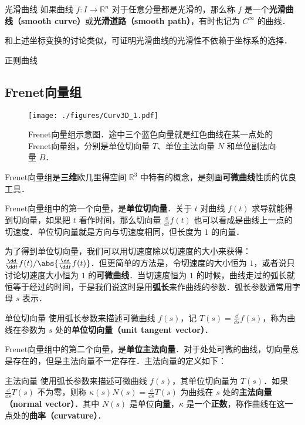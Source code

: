 \begin{definition}{光滑曲线}
如果曲线 $f:I\to\mathbb{R}^n$ 对于任意分量都是光滑的，那么称 $f$ 是一个\textbf{光滑曲线（smooth curve）}或\textbf{光滑道路（smooth path）}，有时也记为 $C^\infty$ 的曲线．
\end{definition}

和上述坐标变换的讨论类似，可证明光滑曲线的光滑性不依赖于坐标系的选择．

\begin{definition}{正则曲线}

\end{definition}

\subsection{Frenet向量组}

\begin{figure}[ht]
\centering
\texttt{[image: ./figures/Curv3D\_1.pdf]}
\caption{Frenet向量组示意图．途中三个蓝色向量就是红色曲线在某一点处的Frenet向量组，分别是单位切向量 $T$、单位主法向量 $N$ 和单位副法向量 $B$．} \label{Curv3D_fig1}
\end{figure}

Frenet向量组是\textbf{三维}欧几里得空间 $\mathbb{R}^3$ 中特有的概念，是刻画\textbf{可微曲线}性质的优良工具．

Frenet向量组中的第一个向量，是\textbf{单位切向量}．关于 $t$ 对曲线 $f(t)$ 求导就能得到切向量，如果把 $t$ 看作时间，那么切向量 $\frac{\dd}{\dd t}f(t)$ 也可以看成是曲线上一点的切速度．单位切向量就是方向与切速度相同，但长度为 $1$ 的向量．

为了得到单位切向量，我们可以用切速度除以切速度的大小来获得：$\frac{\dd}{\dd t}f(t)/\abs{\frac{\dd}{\dd t}f(t)}$．但更简单的方法是，令切速度的大小恒为 $1$，或者说只讨论切速度大小恒为 $1$ 的\textbf{可微曲线}．当切速度恒为 $1$ 的时候，曲线走过的弧长就恒等于经过的时间，于是我们说这时是用\textbf{弧长}来作曲线的参数．弧长参数通常用字母 $s$ 表示．

\begin{definition}{单位切向量}\label{Curv3D_def1}
使用弧长参数来描述可微曲线 $f(s)$，记 $T(s)=\frac{\dd}{\dd s}f(s)$，称为曲线在参数为 $s$ 处的\textbf{单位切向量（unit tangent vector）}．
\end{definition}

Frenet向量组中的第二个向量，是\textbf{单位主法向量}．对于处处可微的曲线，切向量总是存在的，但是主法向量不一定存在．主法向量的定义如下：

\begin{definition}{主法向量}\label{Curv3D_def2}
使用弧长参数来描述可微曲线 $f(s)$，其单位切向量为 $T(s)$．如果 $\frac{\dd}{\dd s}T(s)$ 不为零，则称 $\kappa(s) N(s)=\frac{\dd}{\dd s}T(s)$ 为曲线在 $s$ 处的\textbf{主法向量（normal vector）}．其中 $N(s)$ 是单位\textbf{向量}，$\kappa$ 是一个\textbf{正数}，称作曲线在这一点处的\textbf{曲率（curvature）}．
\end{definition}

